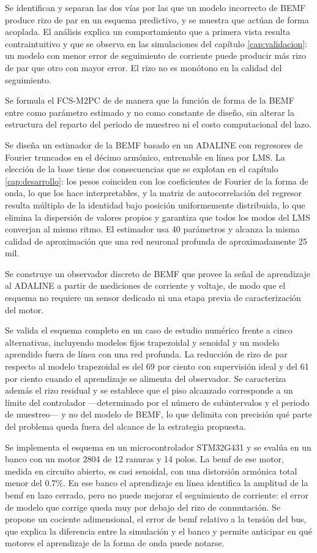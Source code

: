 \documentclass[../../../Tesis_JALS_Maestria.tex]{subfiles}
\begin{document}
Se identifican y separan las dos vías por las que un modelo incorrecto de BEMF produce rizo de par en un esquema predictivo, y se muestra que actúan de forma acoplada. El análisis explica un comportamiento que a primera vista resulta contraintuitivo y que se observa en las simulaciones del capítulo \ref{cap:validacion}: un modelo con menor error de seguimiento de corriente puede producir más rizo de par que otro con mayor error. El rizo no es monótono en la calidad del seguimiento.

Se formula el FCS-M2PC de \citet{coronado2025} de manera que la función de forma de la BEMF entre como parámetro estimado y no como constante de diseño, sin alterar la estructura del reparto del periodo de muestreo ni el costo computacional del lazo.

Se diseña un estimador de la BEMF basado en un ADALINE con regresores de Fourier truncados en el décimo armónico, entrenable en línea por LMS. La elección de la base tiene dos consecuencias que se explotan en el capítulo \ref{cap:desarrollo}: los pesos coinciden con los coeficientes de Fourier de la forma de onda, lo que los hace interpretables, y la matriz de autocorrelación del regresor resulta múltiplo de la identidad bajo posición uniformemente distribuida, lo que elimina la dispersión de valores propios y garantiza que todos los modos del LMS converjan al mismo ritmo. El estimador usa 40 parámetros y alcanza la misma calidad de aproximación que una red neuronal profunda de aproximadamente 25 mil.

Se construye un observador discreto de BEMF que provee la señal de aprendizaje al ADALINE a partir de mediciones de corriente y voltaje, de modo que el esquema no requiere un sensor dedicado ni una etapa previa de caracterización del motor.

Se valida el esquema completo en un caso de estudio numérico frente a cinco alternativas, incluyendo modelos fijos trapezoidal y senoidal y un modelo aprendido fuera de línea con una red profunda. La reducción de rizo de par respecto al modelo trapezoidal es del 69 por ciento con supervisión ideal y del 61 por ciento cuando el aprendizaje se alimenta del observador. Se caracteriza además el rizo residual y se establece que el piso alcanzado corresponde a un límite del controlador ---determinado por el número de subintervalos y el periodo de muestreo--- y no del modelo de BEMF, lo que delimita con precisión qué parte del problema queda fuera del alcance de la estrategia propuesta.

Se implementa el esquema en un microcontrolador STM32G431 y se evalúa en un banco con un motor 2804 de 12 ranuras y 14 polos. La \acrshort{bemf} de ese motor, medida en circuito abierto, es casi senoidal, con una distorsión armónica total menor del $0.7\%$. En ese banco el aprendizaje en línea identifica la amplitud de la \acrshort{bemf} en lazo cerrado, pero no puede mejorar el seguimiento de corriente: el error de modelo que corrige queda muy por debajo del rizo de conmutación. Se propone un cociente adimensional, el error de \acrshort{bemf} relativo a la tensión del bus, que explica la diferencia entre la simulación y el banco y permite anticipar en qué motores el aprendizaje de la forma de onda puede notarse.
\end{document}
